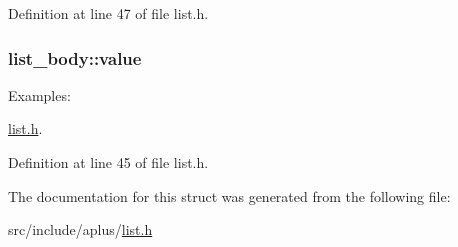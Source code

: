Definition at line 47 of file list.\+h.

\hypertarget{structlist__body_ae3194d24911b82410a61d50f5e6f588d}{
\subsubsection[{value}]{ list\+\_\+body\+::value}}\label{structlist__body_ae3194d24911b82410a61d50f5e6f588d}
\begin{Desc}
\item[Examples\+: ]\par
\hyperlink{list_8h-example}{list.\+h}.\end{Desc}


Definition at line 45 of file list.\+h.



The documentation for this struct was generated from the following file\+:\begin{DoxyCompactItemize}
\item 
src/include/aplus/\hyperlink{list_8h}{list.\+h}\end{DoxyCompactItemize}

